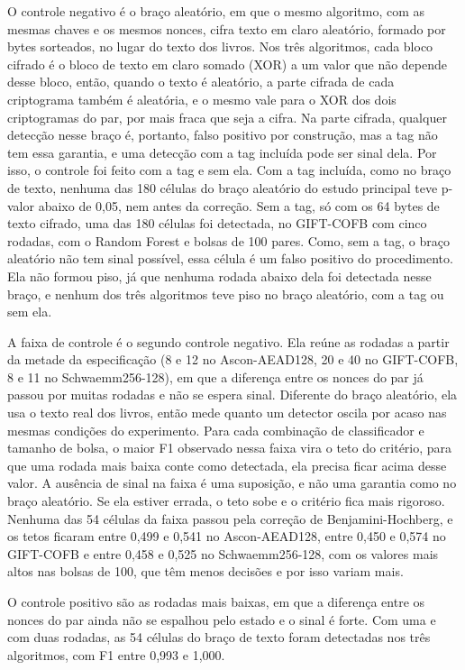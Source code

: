 O controle negativo é o braço aleatório, em que o mesmo algoritmo, com as mesmas chaves e os mesmos nonces, cifra texto em claro aleatório, formado por bytes sorteados, no lugar do texto dos livros. Nos três algoritmos, cada bloco cifrado é o bloco de texto em claro somado (XOR) a um valor que não depende desse bloco, então, quando o texto é aleatório, a parte cifrada de cada criptograma também é aleatória, e o mesmo vale para o XOR dos dois criptogramas do par, por mais fraca que seja a cifra. Na parte cifrada, qualquer detecção nesse braço é, portanto, falso positivo por construção, mas a tag não tem essa garantia, e uma detecção com a tag incluída pode ser sinal dela. Por isso, o controle foi feito com a tag e sem ela. Com a tag incluída, como no braço de texto, nenhuma das 180 células do braço aleatório do estudo principal teve p-valor abaixo de 0,05, nem antes da correção. Sem a tag, só com os 64 bytes de texto cifrado, uma das 180 células foi detectada, no GIFT-COFB com cinco rodadas, com o Random Forest e bolsas de 100 pares. Como, sem a tag, o braço aleatório não tem sinal possível, essa célula é um falso positivo do procedimento. Ela não formou piso, já que nenhuma rodada abaixo dela foi detectada nesse braço, e nenhum dos três algoritmos teve piso no braço aleatório, com a tag ou sem ela.

A faixa de controle é o segundo controle negativo. Ela reúne as rodadas a partir da metade da especificação (8 e 12 no Ascon-AEAD128, 20 e 40 no GIFT-COFB, 8 e 11 no Schwaemm256-128), em que a diferença entre os nonces do par já passou por muitas rodadas e não se espera sinal. Diferente do braço aleatório, ela usa o texto real dos livros, então mede quanto um detector oscila por acaso nas mesmas condições do experimento. Para cada combinação de classificador e tamanho de bolsa, o maior F1 observado nessa faixa vira o teto do critério, para que uma rodada mais baixa conte como detectada, ela precisa ficar acima desse valor. A ausência de sinal na faixa é uma suposição, e não uma garantia como no braço aleatório. Se ela estiver errada, o teto sobe e o critério fica mais rigoroso. Nenhuma das 54 células da faixa passou pela correção de Benjamini-Hochberg, e os tetos ficaram entre 0,499 e 0,541 no Ascon-AEAD128, entre 0,450 e 0,574 no GIFT-COFB e entre 0,458 e 0,525 no Schwaemm256-128, com os valores mais altos nas bolsas de 100, que têm menos decisões e por isso variam mais.

O controle positivo são as rodadas mais baixas, em que a diferença entre os nonces do par ainda não se espalhou pelo estado e o sinal é forte. Com uma e com duas rodadas, as 54 células do braço de texto foram detectadas nos três algoritmos, com F1 entre 0,993 e 1,000.

